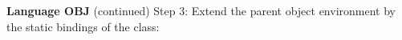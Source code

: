 \begin{minipage}[t]{\sw}
\slidenumber
\LARGE
{\bf Language OBJ} (continued)\exx
Step 3: Extend the parent object environment
by the static bindings of the class:\exx
\centerline{}
\end{minipage}
